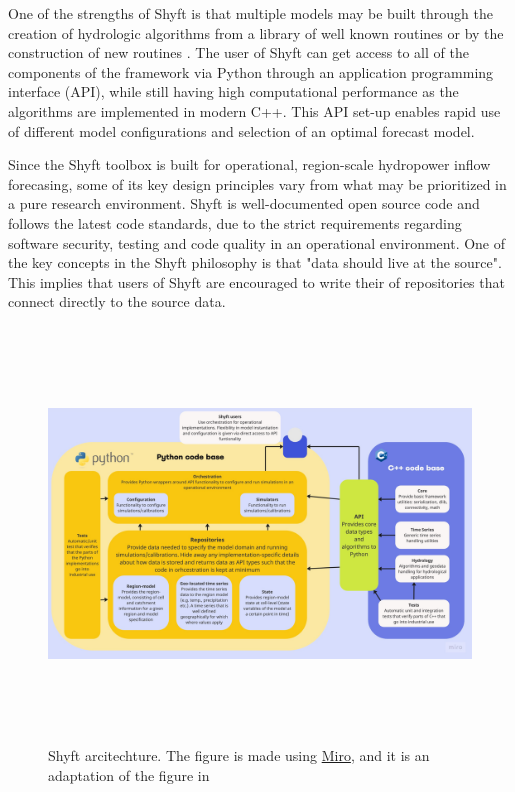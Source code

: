 One of the strengths of Shyft is that multiple models may be built through the creation of hydrologic algorithms from a library of well known routines or by the construction of new routines \autocite{burkhartShyftV4Framework2021}. The user of Shyft can get access to all of the components of the framework via Python through an application programming interface (API), while still having high computational performance as the algorithms are implemented in modern C++. This API set-up enables rapid use of different model configurations and selection of an optimal forecast model. 

Since the Shyft toolbox is built for operational, region-scale hydropower inflow forecasing, some of its key design principles vary from what may be prioritized in a pure research environment. Shyft is well-documented open source code and follows the latest code standards, due to the strict requirements regarding software security, testing and code quality in an operational environment. One of the key concepts in the Shyft philosophy is that "data should live at the source". This implies that users of Shyft are encouraged to write their of repositories that connect directly to the source data.

\begin{figure}[ht]
    \centering
    \includegraphics[width=1.1\textwidth,height=11cm]{figures/methods/Shyft Architecture.jpg}
    \caption{Shyft arcitechture. The figure is made using \href{https://miro.com}{Miro}, and it is an adaptation of the figure in \autocite{burkhartShyftV4Framework2021}}
    \label{fig:shyft_architecture}
\end{figure}


